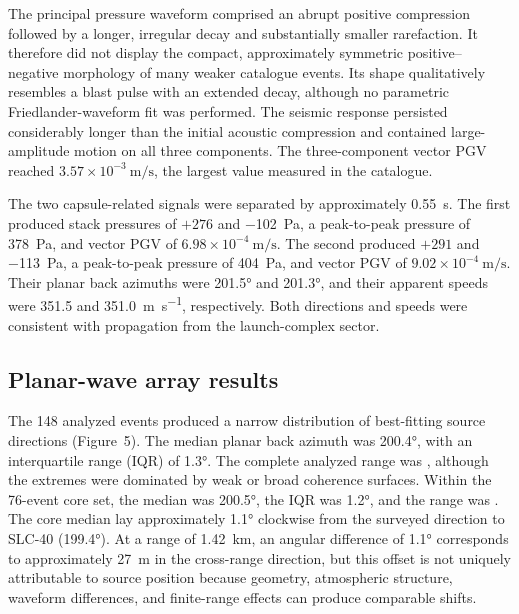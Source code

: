\documentclass[12pt]{article}
\begin{document}
The principal pressure waveform comprised an abrupt positive compression
followed by a longer, irregular decay and substantially smaller rarefaction. It
therefore did not display the compact, approximately symmetric positive--negative
morphology of many weaker catalogue events. Its shape qualitatively resembles a
blast pulse with an extended decay, although no parametric Friedlander-waveform
fit was performed. The seismic response persisted considerably longer than the
initial acoustic compression and contained large-amplitude motion on all three
components. The three-component vector PGV reached
$3.57\times10^{-3}\ \si{\metre\per\second}$, the largest value measured in the
catalogue.

The two capsule-related signals were separated by approximately
\SI{0.55}{\second}. The first produced stack pressures of $+276$ and
\SI{-102}{\pascal}, a peak-to-peak pressure of \SI{378}{\pascal}, and vector
PGV of $6.98\times10^{-4}\ \si{\metre\per\second}$. The second produced
$+291$ and \SI{-113}{\pascal}, a peak-to-peak pressure of
\SI{404}{\pascal}, and vector PGV of
$9.02\times10^{-4}\ \si{\metre\per\second}$. Their planar back azimuths were
\ang{201.5} and \ang{201.3}, and their apparent speeds were 351.5 and
\SI{351.0}{\metre\per\second}, respectively. Both directions and speeds were
consistent with propagation from the launch-complex sector.

\subsection{Planar-wave array results}

The 148 analyzed events produced a narrow distribution of best-fitting source
directions (Figure~5). The median planar back azimuth was \ang{200.4}, with an
interquartile range (IQR) of \ang{1.3}. The complete analyzed range was
, although the extremes were dominated by weak or broad
coherence surfaces. Within the 76-event core set, the median was \ang{200.5},
the IQR was \ang{1.2}, and the range was . The core
median lay approximately \ang{1.1} clockwise from the surveyed direction to
SLC-40 (\ang{199.4}). At a range of \SI{1.42}{\kilo\metre}, an angular
difference of \ang{1.1} corresponds to approximately \SI{27}{\metre} in the
cross-range direction, but this offset is not uniquely attributable to source
position because geometry, atmospheric structure, waveform differences, and
finite-range effects can produce comparable shifts.
\end{document}
